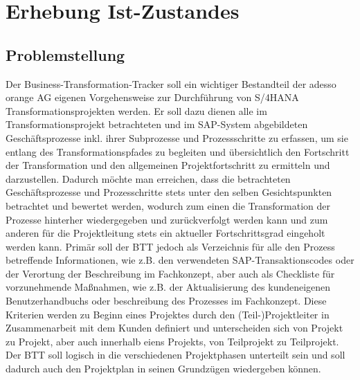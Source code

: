 \section{Erhebung Ist-Zustandes}

\subsection{Problemstellung}
Der Business-Transformation-Tracker soll ein wichtiger Bestandteil der adesso orange AG eigenen Vorgehensweise zur Durchführung von S/4HANA Transformationsprojekten werden. Er soll dazu dienen alle im Transformationsprojekt betrachteten und im SAP-System abgebildeten Geschäftsprozesse inkl. ihrer Subprozesse und Prozessschritte zu erfassen, um sie entlang des Transformationspfades zu begleiten und übersichtlich den Fortschritt der Transformation und den allgemeinen Projektfortschritt zu ermitteln und darzustellen. Dadurch möchte man erreichen, dass die betrachteten Geschäftsprozesse und Prozesschritte stets unter den selben Gesichtspunkten betrachtet und bewertet werden, wodurch zum einen die Transformation der Prozesse hinterher wiedergegeben und zurückverfolgt werden kann und zum anderen für die Projektleitung stets ein aktueller Fortschrittsgrad eingeholt werden kann. Primär soll der BTT jedoch als Verzeichnis für alle den Prozess betreffende Informationen, wie z.B. den verwendeten SAP-Transaktionscodes oder der Verortung der Beschreibung im Fachkonzept, aber auch als Checkliste für vorzunehmende Maßnahmen, wie z.B. der Aktualisierung des kundeneigenen Benutzerhandbuchs oder beschreibung des Prozesses im Fachkonzept. Diese Kriterien werden zu Beginn eines Projektes durch den (Teil-)Projektleiter in Zusammenarbeit mit dem Kunden definiert und unterscheiden sich von Projekt zu Projekt, aber auch innerhalb eiens Projekts, von Teilprojekt zu Teilprojekt. Der BTT soll logisch in die verschiedenen Projektphasen unterteilt sein und soll dadurch auch den Projektplan in seinen Grundzügen wiedergeben können.


